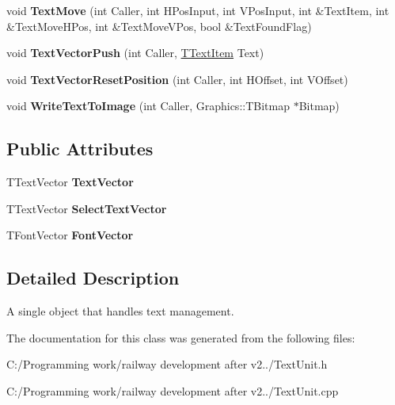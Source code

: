 \begin{DoxyCompactItemize}
void {\bfseries Text\+Move} (int Caller, int H\+Pos\+Input, int V\+Pos\+Input, int \&Text\+Item, int \&Text\+Move\+H\+Pos, int \&Text\+Move\+V\+Pos, bool \&Text\+Found\+Flag)
\item 
\mbox{\label{class_t_text_handler_aa91cd392aacad3dbd69541b2ecad7f8e}} 
void {\bfseries Text\+Vector\+Push} (int Caller, \mbox{\hyperlink{class_t_text_item}{T\+Text\+Item}} Text)
\item 
\mbox{\label{class_t_text_handler_a599c1a13d78b63a18ebc17550dfa9a0d}} 
void {\bfseries Text\+Vector\+Reset\+Position} (int Caller, int H\+Offset, int V\+Offset)
\item 
\mbox{\label{class_t_text_handler_a7d202827ae62cd288a07431579977539}} 
void {\bfseries Write\+Text\+To\+Image} (int Caller, Graphics\+::\+T\+Bitmap $\ast$Bitmap)
\end{DoxyCompactItemize}
\subsection*{Public Attributes}
\begin{DoxyCompactItemize}
\item 
\mbox{\label{class_t_text_handler_a059b11907e0db9c7a847682a455b9cb9}} 
T\+Text\+Vector {\bfseries Text\+Vector}
\item 
\mbox{\label{class_t_text_handler_a5191f5daba7e3f1ea8f0ae82d8067211}} 
T\+Text\+Vector {\bfseries Select\+Text\+Vector}
\item 
\mbox{\label{class_t_text_handler_a3eec5ed173503c7d69271f2f4515db13}} 
T\+Font\+Vector {\bfseries Font\+Vector}
\end{DoxyCompactItemize}


\subsection{Detailed Description}
A single object that handles text management. 

The documentation for this class was generated from the following files\+:\begin{DoxyCompactItemize}
\item 
C\+:/\+Programming work/railway development after v2../Text\+Unit.\+h\item 
C\+:/\+Programming work/railway development after v2../Text\+Unit.\+cpp\end{DoxyCompactItemize}
